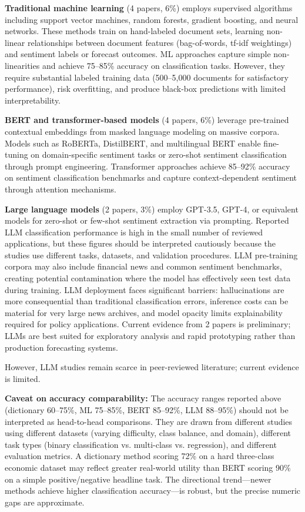\documentclass[11pt,twocolumn]{article}
\begin{document}
\textbf{Traditional machine learning} (4 papers, 6\%) employs supervised algorithms including support vector machines, random forests, gradient boosting, and neural networks. These methods train on hand-labeled document sets, learning non-linear relationships between document features (bag-of-words, tf-idf weightings) and sentiment labels or forecast outcomes. ML approaches capture simple non-linearities and achieve 75--85\% accuracy on classification tasks. However, they require substantial labeled training data (500--5,000 documents for satisfactory performance), risk overfitting, and produce black-box predictions with limited interpretability.

\textbf{BERT and transformer-based models} (4 papers, 6\%) leverage pre-trained contextual embeddings from masked language modeling on massive corpora. Models such as RoBERTa, DistilBERT, and multilingual BERT enable fine-tuning on domain-specific sentiment tasks or zero-shot sentiment classification through prompt engineering. Transformer approaches achieve 85--92\% accuracy on sentiment classification benchmarks and capture context-dependent sentiment through attention mechanisms.

\textbf{Large language models} (2 papers, 3\%) employ GPT-3.5, GPT-4, or equivalent models for zero-shot or few-shot sentiment extraction via prompting. Reported LLM classification performance is high in the small number of reviewed applications, but these figures should be interpreted cautiously because the studies use different tasks, datasets, and validation procedures. LLM pre-training corpora may also include financial news and common sentiment benchmarks, creating potential contamination where the model has effectively seen test data during training. LLM deployment faces significant barriers: hallucinations are more consequential than traditional classification errors, inference costs can be material for very large news archives, and model opacity limits explainability required for policy applications. Current evidence from 2 papers is preliminary; LLMs are best suited for exploratory analysis and rapid prototyping rather than production forecasting systems.

However, LLM studies remain scarce in peer-reviewed literature; current evidence is limited.

\textbf{Caveat on accuracy comparability:} The accuracy ranges reported above (dictionary 60--75\%, ML 75--85\%, BERT 85--92\%, LLM 88--95\%) should not be interpreted as head-to-head comparisons. They are drawn from different studies using different datasets (varying difficulty, class balance, and domain), different task types (binary classification vs. multi-class vs. regression), and different evaluation metrics. A dictionary method scoring 72\% on a hard three-class economic dataset may reflect greater real-world utility than BERT scoring 90\% on a simple positive/negative headline task. The directional trend---newer methods achieve higher classification accuracy---is robust, but the precise numeric gaps are approximate.
\end{document}
